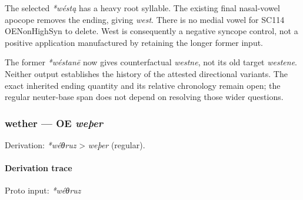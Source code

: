 \documentclass[
  british,
  a4paper,
]{article}
\providecommand{\Recon}[1]{\emph{*#1}}
\begin{document}
The selected \Recon{wéstą} has a heavy root syllable. The existing final
nasal-vowel apocope removes the ending, giving {\emph{west}}. There is
no medial vowel for SC114 OENonHighSyn to delete. West is consequently a
negative syncope control, not a positive application manufactured by
retaining the longer former input.

The former \Recon{wéstanē} now gives counterfactual \emph{westne}, not
its old target \emph{westene}. Neither output establishes the history of
the attested directional variants. The exact inherited ending quantity
and its relative chronology remain open; the regular neuter-base span
does not depend on resolving those wider questions.

\subsubsection{\texorpdfstring{wether --- OE
\emph{weþer}}{wether --- OE weþer}}\label{wether-oe-weuxfeer}

Derivation: \emph{*wéθruz} \textgreater{} \emph{weþer} (regular).

\paragraph{Derivation trace}\label{derivation-trace-96}

Proto input: \emph{*wéθruz}

\begingroup
\setlength{\fboxsep}{6pt}
\end{document}
